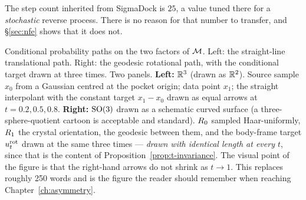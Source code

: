 The step count inherited from SigmaDock is $25$, a value tuned there for a
\emph{stochastic} reverse process. There is no reason for that number to
transfer, and \S\ref{sec:nfe} shows that it does not.

{Conditional probability paths on the two factors of $\mathcal{M}$. Left: the
straight-line translational path. Right: the geodesic rotational path, with
the conditional target drawn at three times.}
{Two panels.
\textbf{Left:} $\mathbb{R}^3$ (drawn as $\mathbb{R}^2$). Source sample $x_0$ from a Gaussian
centred at the pocket origin; data point $x_1$; the straight interpolant with
the constant target $x_1-x_0$ drawn as equal arrows at $t=0.2,0.5,0.8$.
\textbf{Right:} $\mathrm{SO}(3)$ drawn as a schematic curved surface (a
three-sphere-quotient cartoon is acceptable and standard). $R_0$ sampled
Haar-uniformly, $R_1$ the crystal orientation, the geodesic between them,
and the body-frame target $u_t^{\mathrm{rot}}$ drawn at the same three
times --- \emph{drawn with identical length at every $t$}, since that is the
content of Proposition~\ref{prop:t-invariance}.
The visual point of the figure is that the right-hand arrows do not shrink as
$t \to 1$. This replaces roughly 250 words and is the figure the reader should
remember when reaching Chapter~\ref{ch:asymmetry}.}
